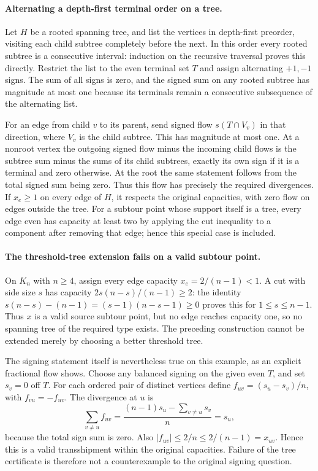 \documentclass[11pt]{article}
\begin{document}
\paragraph{Alternating a depth-first terminal order on a tree.}
Let $H$ be a rooted spanning tree, and list the vertices in
depth-first preorder, visiting each child subtree completely before
the next. In this order every rooted subtree is a consecutive
interval: induction on the recursive traversal proves this directly.
Restrict the list to the even terminal set $T$ and assign
alternating $+1,-1$ signs. The sum of all signs is zero,
and the signed sum on any rooted subtree has magnitude at most
one because its terminals remain a consecutive subsequence of the
alternating list.

For an edge from child $v$ to its parent, send signed flow
$s(T\cap V_v)$ in that direction, where $V_v$ is the
child subtree. This has magnitude at most one. At a nonroot
vertex the outgoing signed flow minus the incoming child flows is
the subtree sum minus the sums of its child subtrees, exactly
its own sign if it is a terminal and zero otherwise. At the
root the same statement follows from the total signed sum being
zero. Thus this flow has precisely the required divergences.
If $x_e\ge1$ on every edge of $H$, it respects the
original capacities, with zero flow on edges outside the tree.
For a subtour point whose support itself is a tree, every edge
even has capacity at least two by applying the cut inequality
to a component after removing that edge; hence this special case
is included.

\paragraph{The threshold-tree extension fails on a valid subtour point.}
On $K_n$ with $n\ge4$, assign every edge capacity
$x_e=2/(n-1)<1$. A cut with side size $s$ has capacity
$2s(n-s)/(n-1)\ge2$: the identity
$s(n-s)-(n-1)=(s-1)(n-s-1)\ge0$ proves this for
$1\le s\le n-1$. Thus $x$ is a valid source subtour
point, but no edge reaches capacity one, so no spanning tree
of the required type exists. The preceding construction cannot
be extended merely by choosing a better threshold tree.

The signing statement itself is nevertheless true on this example,
as an explicit fractional flow shows. Choose any balanced signing
on the given even $T$, and set $s_v=0$ off $T$.
For each ordered pair of distinct vertices define
$f_{uv}=(s_u-s_v)/n$, with $f_{vu}=-f_{uv}$.
The divergence at $u$ is
\[
\sum_{v\ne u}f_{uv}
=\frac{(n-1)s_u-\sum_{v\ne u}s_v}{n}=s_u,
\]
because the total sign sum is zero. Also
$|f_{uv}|\le2/n\le2/(n-1)=x_{uv}$.
Hence this is a valid transshipment within the original capacities.
Failure of the tree certificate is therefore not a counterexample
to the original signing question.
\end{document}
